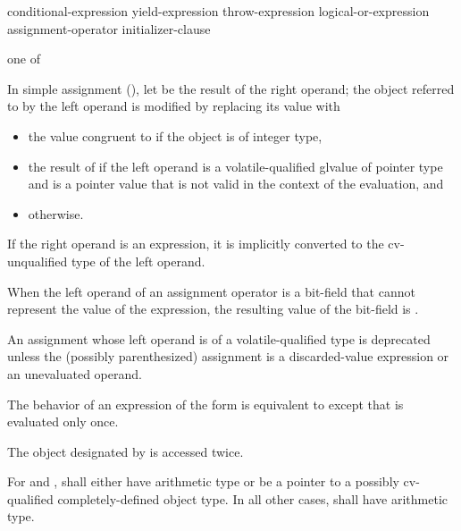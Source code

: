 \begin{bnf}
\br
    conditional-expression\br
    yield-expression\br
    throw-expression\br
    logical-or-expression assignment-operator initializer-clause
\end{bnf}

\begin{bnf}
 \textnormal{one of}\br
    \terminal{=  *=  /=  \%=   +=  -=  >>=  <<=  \&=  \caret=  |=}
\end{bnf}

\pnum
In simple assignment (\tcode{=}),
let  be the result of the right operand;
the object referred to by the left operand is
modified by replacing its value
with
\begin{itemize}
\item
the value congruent to 
if the object is of integer type,
\item
the result of 
if the left operand is a volatile-qualified glvalue of pointer type 
and  is a pointer value
that is not valid in the context of the evaluation, and
\item
{} otherwise.
\end{itemize}

\pnum
{}%
If the right operand is an expression, it is implicitly
converted to the cv-unqualified type of the left
operand.

\pnum
{}%
When the left operand of an assignment operator
is a bit-field that cannot represent the value of the expression, the
resulting value of the bit-field is
.

\pnum
An assignment whose left operand is of
a volatile-qualified type is deprecated
unless the (possibly parenthesized) assignment is a discarded-value expression or
an unevaluated operand.

\pnum
The behavior of an expression of the form 
is equivalent to  except
that  is evaluated only once.
\begin{note}
The object designated by  is accessed twice.
\end{note}
For \tcode{+=} and \tcode{-=},
 shall either have arithmetic type or be a pointer to a
possibly cv-qualified completely-defined object type. In all other
cases,  shall have arithmetic type.

